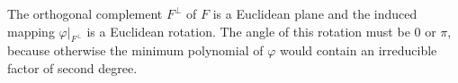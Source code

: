 The orthogonal complement $F^\perp$ of $F$ is a Euclidean plane and the induced mapping $\varphi|_{F^\perp}$ is a Euclidean rotation. The angle of this rotation must be $0$ or $\pi$, because otherwise the minimum polynomial of $\varphi$ would contain an irreducible factor of second degree.
